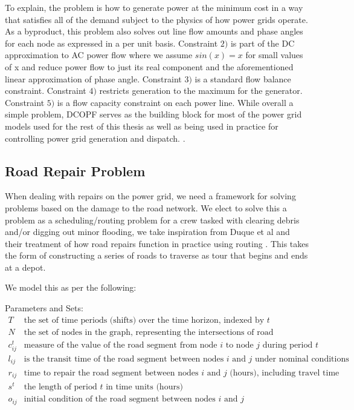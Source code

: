 \documentclass{article}
\begin{document}
To explain, the problem is how to generate power at the minimum cost in a way that satisfies all of the demand subject to the physics of how power grids operate. As a byproduct, this problem also solves out line flow amounts and phase angles for each node as expressed in a per unit basis. Constraint $2)$ is part of the DC approximation to AC power flow where we assume $sin(x) = x$ for small values of x and reduce power flow to just its real component and the aforementioned linear approximation of phase angle. Constraint $3)$ is a standard flow balance constraint. Constraint $4)$ restricts generation to the maximum for the generator. Constraint $5)$ is a flow capacity constraint on each power line. While overall a simple problem, DCOPF serves as the building block for most of the power grid models used for the rest of this thesis as well as being used in practice for controlling power grid generation and dispatch. \cite{LiBo2007}. 
	
	
	\subsection{Road Repair Problem}
	When dealing with repairs on the power grid, we need a framework for solving problems based on the damage to the road network. We elect to solve this a problem as a scheduling/routing problem for a crew tasked with clearing debris and/or digging out minor flooding, we take inspiration from Duque et al \cite{DuqueEA2016} and their treatment of how road repairs function in practice using routing . This takes the form of constructing a series of roads to traverse as tour that begins and ends at a depot.
	
	We model this as per the following:
	
	Parameters and Sets:
	\begin{displaymath}
	\begin{array}{ll}
	T & \mbox{the set of time periods (shifts) over the time horizon, indexed by $t$}\\
	N & \mbox{the set of nodes in the graph, representing the intersections of road segments}\\
	c_{ij}^t & \mbox{measure of the value of the road segment from node $i$ to node $j$ during period $t$}\\
	l_{ij} & \mbox{is the transit time of the road segment between nodes $i$ and $j$ under nominal conditions}\\
	r_{ij} & \mbox{time to repair the road segment between nodes $i$ and $j$ (hours), including travel time}\\
	s^t & \mbox{the length of period $t$ in time units (hours)}\\
	o_{ij} & \mbox{initial condition of the road segment between nodes $i$ and $j$}\\
	\end{array}
	\end{displaymath}
	
\end{document}
